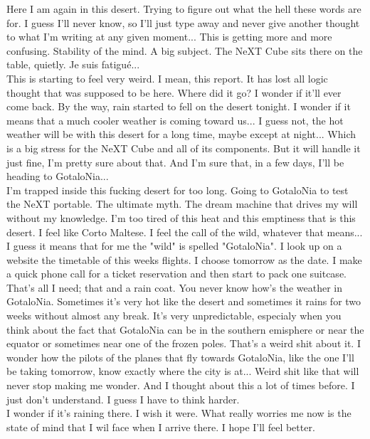 \documentclass[11pt,twoside,a4paper]{book}
\begin{document}
\begin{multicols*}{2}
Here I am again in this desert. Trying to figure out what the hell these words are for. I guess I'll never know, so I'll just type away and never give another thought to what I'm writing at any given moment... This is getting more and more confusing. Stability of the mind. A big subject. The NeXT Cube sits there on the table, quietly. Je suis fatigu{\'e}... ~\\

This is starting to feel very weird. I mean, this report. It has lost all logic thought that was supposed to be here. Where did it go? I wonder if it'll ever come back. By the way, rain started to fell on the desert tonight. I wonder if it means that a much cooler weather is coming toward us... I guess not, the hot weather will be with this desert for a long time, maybe except at night... Which is a big stress for the NeXT Cube and all of its components. But it will handle it just fine, I'm pretty sure about that. And I'm sure that, in a few days, I'll be heading to GotaloNia... ~\\

I'm trapped inside this fucking desert for too long. Going to GotaloNia to test the NeXT portable. The ultimate myth. The dream machine that drives my will without my knowledge. I'm too tired of this heat and this emptiness that is this desert. I feel like Corto Maltese. I feel the call of the wild, whatever that means... I guess it means that for me the "wild" is spelled "GotaloNia". I look up on a website the timetable of this weeks flights. I choose tomorrow as the date. I make a quick phone call for a ticket reservation and then start to pack one suitcase. That's all I need; that and a rain coat. You never know how's the weather in GotaloNia. Sometimes it's very hot like the desert and sometimes it rains for two weeks without almost any break. It's very unpredictable, especialy when you think about the fact that GotaloNia can be in the southern emisphere or near the equator or sometimes near one of the frozen poles. That's a weird shit about it. I wonder how the pilots of the planes that fly towards GotaloNia, like the one I'll be taking tomorrow, know exactly where the city is at... Weird shit like that will never stop making me wonder. And I thought about this a lot of times before. I just don't understand. I guess I have to think harder. ~\\

I wonder if it's raining there. I wish it were. What really worries me now is the state of mind that I wil face when I arrive there. I hope I'll feel better. ~\\


\end{multicols*}
\end{document}
